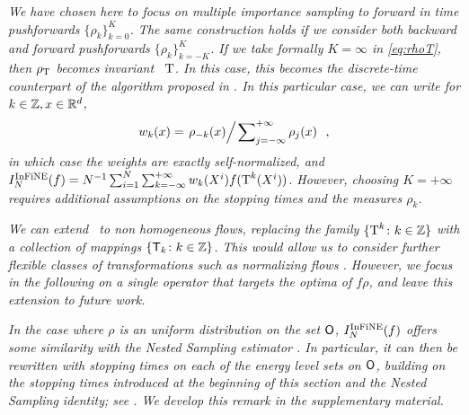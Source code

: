 \documentclass{article}
\begin{document}
\begin{remark}\em
\label{remark1}
We have chosen here to focus on multiple importance sampling to forward in time pushforwards $\{\rho_k\}_{k=0}^K$. The same construction holds if we consider both backward and forward pushforwards $\{\rho_k\}_{k=-K}^K$.
If we take formally $K=\infty$ in \eqref{eq:rhoT}, then $\rho_{\operatorname{T}}$ becomes invariant \wrt\ $\operatorname{T}$. In this case, this becomes the discrete-time counterpart of the algorithm proposed in \cite{rotskoff:vanden-eijden:2019}.
In this particular case, we can write for $k\in\mathbb{Z}, x\in\mathbb{R}^d$,
\[
 w_{k}(x) =  \left.  \rho_{-k}(x) \middle / \left. \sum\nolimits_{j=-\infty}^{+\infty} \rho_{j}(x) \right.\right. \;,
\]
in which case the weights are exactly self-normalized, and
$I^{\operatorname{InFiNE}}_N(f) =  N^{-1} \sum_{i=1}^N \sum_{k=-\infty}^{+\infty} w_k(X^i)  f(\operatorname{T}^k(X^i))$.
However, choosing $K=+\infty$ requires additional assumptions on the stopping times and the measures $\rho_k$.
\end{remark}
\begin{remark}\em
We can extend \IFIS\ to non homogeneous flows, replacing the family $\{\operatorname{T}^k\colon k\in\mathbb{Z}\}$ with a collection of mappings $\{\mathsf{T}_k\colon k\in\mathbb{Z}\}$.
This would allow us to consider further flexible classes of transformations such as normalizing flows \cite{papamakarios2019normalizing}.
However, we focus in the following on a single operator that targets the optima of $f\rho$, and leave this extension to future work.
\end{remark}
\begin{remark}\em
In the case where $\rho$ is an uniform distribution on the set $\mathsf{O}$, $I^{\operatorname{InFiNE}}_N(f)$ offers some similarity with the Nested Sampling estimator \cite{skilling2006nested}. In particular, it can then be rewritten with stopping times on each of the energy level sets on $\mathsf{O}$, building on the stopping times introduced at the beginning of this section and the Nested Sampling identity; see \citep[Section 2]{chopin:robert:2010}. We develop this remark in the supplementary material.
\end{remark}
\end{document}
